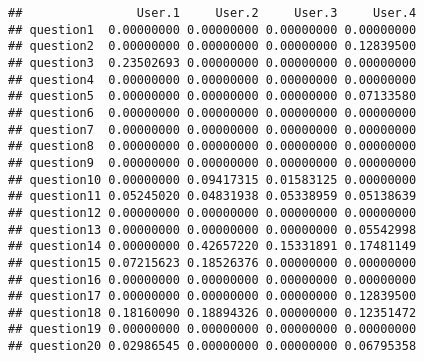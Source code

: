 \documentclass[]{article}
\begin{document}
\begin{verbatim}
##                User.1     User.2     User.3     User.4
## question1  0.00000000 0.00000000 0.00000000 0.00000000
## question2  0.00000000 0.00000000 0.00000000 0.12839500
## question3  0.23502693 0.00000000 0.00000000 0.00000000
## question4  0.00000000 0.00000000 0.00000000 0.00000000
## question5  0.00000000 0.00000000 0.00000000 0.07133580
## question6  0.00000000 0.00000000 0.00000000 0.00000000
## question7  0.00000000 0.00000000 0.00000000 0.00000000
## question8  0.00000000 0.00000000 0.00000000 0.00000000
## question9  0.00000000 0.00000000 0.00000000 0.00000000
## question10 0.00000000 0.09417315 0.01583125 0.00000000
## question11 0.05245020 0.04831938 0.05338959 0.05138639
## question12 0.00000000 0.00000000 0.00000000 0.00000000
## question13 0.00000000 0.00000000 0.00000000 0.05542998
## question14 0.00000000 0.42657220 0.15331891 0.17481149
## question15 0.07215623 0.18526376 0.00000000 0.00000000
## question16 0.00000000 0.00000000 0.00000000 0.00000000
## question17 0.00000000 0.00000000 0.00000000 0.12839500
## question18 0.18160090 0.18894326 0.00000000 0.12351472
## question19 0.00000000 0.00000000 0.00000000 0.00000000
## question20 0.02986545 0.00000000 0.00000000 0.06795358
\end{verbatim}
\end{document}
